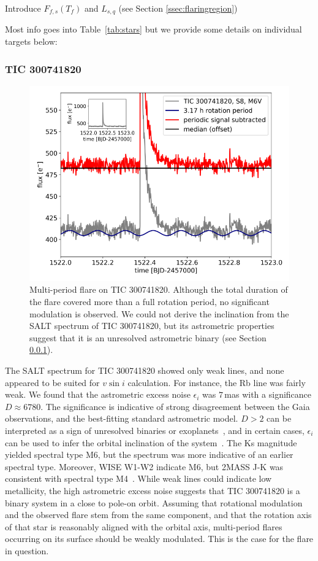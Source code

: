 \documentclass[fleqn,usenatbib,letters]{mnras}%
\newcommand{\FF}{TIC 300741820} %
\begin{document}
Introduce $F_{f,s}(T_f)$ and $L_{s,q}$ (see Section \ref{ssec:flaringregion})

Most info goes into Table~\ref{tab:stars} but we provide some details on individual targets below:

\subsubsection{\FF}
\label{sec:propsF}
\begin{figure}
	\includegraphics[width=\columnwidth]{figures/EPIC300741820_inset.png}
    \caption{Multi-period flare on \FF. Although the total duration of the flare covered more than a full rotation period, no significant modulation is observed. We could not derive the inclination from the SALT spectrum of \FF, but its astrometric properties suggest that it is an unresolved astrometric binary (see Section \ref{sec:propsF}).}
    \label{fig:\FF}
\end{figure}
The SALT spectrum for \FF\; showed only weak lines, and none appeared to be suited for $v \sin i$ calculation. For instance, the Rb line was fairly weak. We found that the astrometric excess noise $\epsilon_i$ was $7$\,mas with a significance $D\approx6780$. The significance is indicative of strong disagreement between the Gaia observations, and the best-fitting standard astrometric model. $D>2$ can be interpreted as a sign of unresolved binaries or exoplanets~\citep{lindegren2012}, and in certain cases, $\epsilon_i$ can be used to infer the orbital inclination of the system~\citep{kiefer2019a, kiefer2019b}. The Ks magnitude yielded spectral type M6, but the spectrum was more indicative of an earlier spectral type. Moreover, WISE W1-W2 indicate M6, but 2MASS J-K was consistent with spectral type M4~\citep{pecaut2013}. While weak lines could indicate low metallicity, the high astrometric excess noise suggests that \FF\; is a binary system in a close to pole-on orbit. Assuming that rotational modulation and the observed flare stem from the same component, and that the rotation axis of that star is reasonably aligned with the orbital axis, multi-period flares occurring on its surface should be weakly modulated. This is the case for the flare in question.
\end{document}
